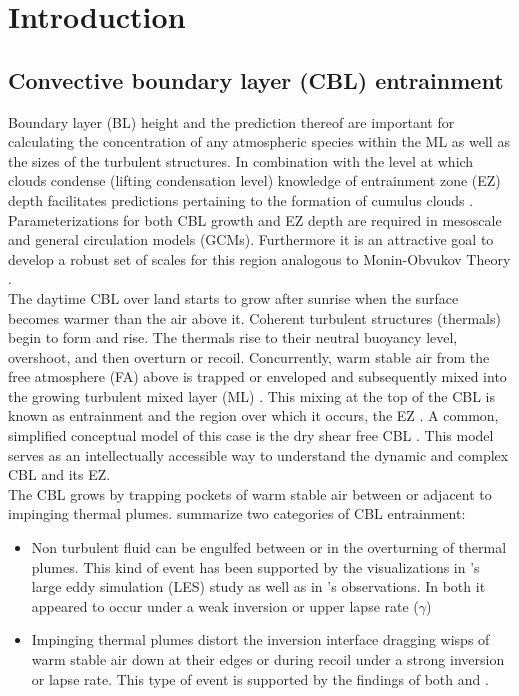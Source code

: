 \section{Introduction}
\label{intro}


\subsection{Convective boundary layer (CBL) entrainment}
\label{sec:cblent}
Boundary layer (BL) height and the prediction thereof are important for calculating the concentration of any atmospheric species within the ML as well as the sizes of the turbulent structures.  In combination with the level at which clouds condense (lifting condensation level) knowledge of entrainment zone (EZ) depth facilitates predictions pertaining to the formation of cumulus clouds \cite{WilStu}.  Parameterizations for both CBL growth and EZ depth are required in mesoscale and general circulation models (GCMs).  Furthermore it is an attractive goal to develop a robust set of scales for this region analogous to Monin-Obvukov Theory \citep{Stull-BLMetIntro, Traum11, SteynBaldHoff, StullNelEl, Sorbjan1}.\\

The daytime CBL over land starts to grow after sunrise when the surface becomes warmer than the air above it.  Coherent turbulent structures (thermals) begin to form and rise. The thermals rise to their neutral buoyancy level, overshoot, and then overturn or recoil.  Concurrently, warm stable air from the free atmosphere (FA) above is trapped or enveloped and subsequently mixed into the growing turbulent mixed layer (ML) \citep{Stull-BLMetIntro}.  This mixing at the top of the CBL is known as entrainment and the region over which it occurs, the EZ \citep{DearWill80}. A common, simplified conceptual model of this case is the dry shear free CBL \citep{SullMoengStev, FedConzMir04, BrooksFowler2}. This model serves as an intellectually accessible way to understand the dynamic and complex CBL and its EZ.\\

The CBL grows by trapping pockets of warm stable air between
or adjacent to impinging thermal plumes.  \citep{Traum11} summarize two categories of CBL entrainment:\\

\begin{itemize}

\item{Non turbulent fluid can be engulfed between or in the overturning of thermal plumes. This kind of event has been supported by the visualizations in \cite{SullMoengStev}'s large eddy simulation (LES) study as well as in \cite{Traum11}'s observations. In both it appeared to occur under a weak inversion or upper lapse rate ($\gamma$)}

\item{
Impinging thermal plumes distort the inversion interface dragging wisps of warm stable air down at their edges or during recoil under a strong inversion or lapse rate. This type of event is supported by the findings  of both \cite{SullMoengStev} and \cite{Traum11}.}

\end{itemize}

